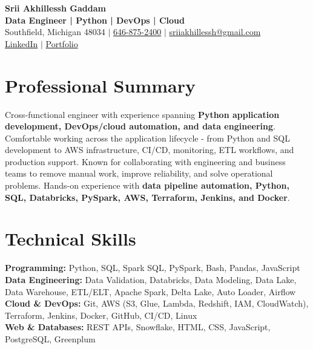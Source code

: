 \documentclass[letterpaper,10pt]{article}
\begin{document}
\fontsize{9.35pt}{10.45pt}\selectfont

\begin{center}
    {\LARGE \textbf{Srii Akhillessh Gaddam}} \\[-1pt]
    \textbf{Data Engineer | Python | DevOps | Cloud} \\[2pt]
    Southfield, Michigan 48034 $|$
    \href{tel:6468752400}{646-875-2400} $|$
    \href{mailto:sriiakhillessh@gmail.com}{sriiakhillessh@gmail.com} \\[1pt]
    \href{https://www.linkedin.com/in/srii-akhiilessh-gaddam-b48668191/}{LinkedIn} $|$
    \href{https://sriiakhillesshg.github.io/portfolio/}{Portfolio}
\end{center}
\vspace{-8pt}

\section{Professional Summary}
\small{Cross-functional engineer with experience spanning \textbf{Python application development, DevOps/cloud automation, and data engineering}. Comfortable working across the application lifecycle - from Python and SQL development to AWS infrastructure, CI/CD, monitoring, ETL workflows, and production support. Known for collaborating with engineering and business teams to remove manual work, improve reliability, and solve operational problems. Hands-on experience with \textbf{data pipeline automation, Python, SQL, Databricks, PySpark, AWS, Terraform, Jenkins, and Docker}.}

\section{Technical Skills}
\small{
\textbf{Programming:} Python, SQL, Spark SQL, PySpark, Bash, Pandas, JavaScript \\
\textbf{Data Engineering:} Data Validation, Databricks, Data Modeling, Data Lake, Data Warehouse, ETL/ELT, Apache Spark, Delta Lake, Auto Loader, Airflow \\
\textbf{Cloud \& DevOps:} Git, AWS (S3, Glue, Lambda, Redshift, IAM, CloudWatch), Terraform, Jenkins, Docker, GitHub, CI/CD, Linux \\
\textbf{Web \& Databases:} REST APIs, Snowflake, HTML, CSS, JavaScript, PostgreSQL, Greenplum
}
\end{document}

